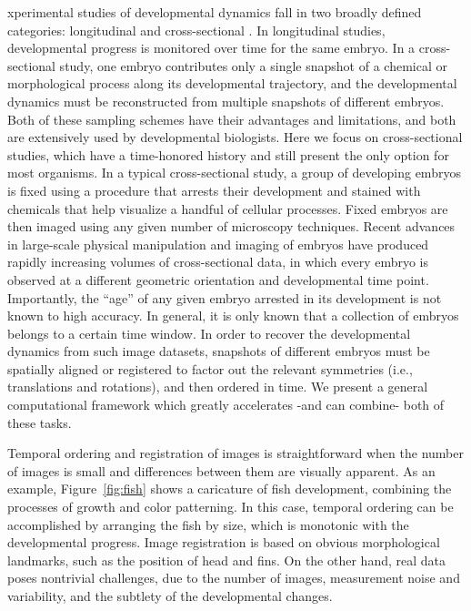 \documentclass{pnastwo}
\begin{document}
\begin{article}
xperimental studies of developmental dynamics fall in two broadly defined categories: longitudinal and cross-sectional \cite{diggle2002analysis}.
%
In longitudinal studies, developmental progress is monitored over time for the same embryo.
%
In a cross-sectional study, one embryo contributes only a single snapshot of a chemical or morphological process along its developmental trajectory, and the developmental dynamics must be reconstructed from multiple snapshots of different embryos.
%
Both of these sampling schemes have their advantages and limitations, and both are extensively used by developmental biologists.
%
Here we focus on cross-sectional studies, which have a time-honored history and still present the only option for most organisms.
%
In a typical cross-sectional study, a group of developing embryos is fixed using a procedure that arrests their development and stained with chemicals that help visualize a handful of cellular processes.
%
Fixed embryos are then imaged using any given number of microscopy techniques.
%
Recent advances in large-scale physical manipulation and imaging of embryos have produced rapidly increasing volumes of cross-sectional data, in which every embryo is observed at a different geometric orientation and developmental time point.
%
Importantly, the ``age'' of any given embryo arrested in its development is not known to high accuracy.
%
In general, it is only known that a collection of embryos belongs to a certain time window.
%
In order to recover the developmental dynamics from such image datasets, snapshots of different embryos must be spatially aligned or registered to factor out the relevant symmetries (i.e., translations and rotations), and then ordered in time.
%
We present a general computational framework which greatly accelerates -and can combine- both of these tasks.

Temporal ordering and registration of images is straightforward when the number of images is small and differences between them are visually apparent.
%
As an example, Figure~\ref{fig:fish} shows a caricature of fish development, combining the processes of growth and color patterning.
%
In this case, temporal ordering can be accomplished by arranging the fish by size, which is monotonic with the developmental progress.
%
Image registration is based on obvious morphological landmarks, such as the position of head and fins.
%
On the other hand, real data poses nontrivial challenges, due to the number of images, measurement noise and variability, and the subtlety of the developmental changes.


\end{article}
\end{document}
